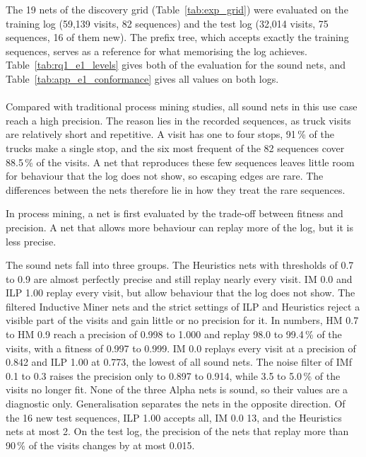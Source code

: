 The 19 nets of the discovery grid (Table~\ref{tab:exp_grid}) were evaluated on the
training log (59,139 visits, 82 sequences) and the test log (32,014 visits, 75
sequences, 16 of them new). The prefix tree, which accepts exactly the training
sequences, serves as a reference for what memorising the log achieves.
Table~\ref{tab:rq1_e1_levels} gives both  of the evaluation for the sound
nets, and Table~\ref{tab:app_e1_conformance} gives all values on both logs.



\paragraph{}
\label{sec:res_e1_level1}
Compared with traditional process mining studies, all sound nets in this use case reach a high precision.
The reason lies in the recorded sequences, as truck visits are relatively short and repetitive. A visit has one
to four stops, 91\,\% of the trucks make a single stop, and the six most frequent of
the 82 sequences cover 88.5\,\% of the visits. A net that reproduces these few
sequences leaves little room for behaviour that the log does not show, so escaping
edges are rare. The differences between the nets therefore lie in how they treat the
rare sequences.

In process mining, a net is first evaluated by the trade-off between fitness and
precision. A net that allows more behaviour can replay more of the log, but it is
less precise. 

The sound nets fall into three groups. The Heuristics nets with thresholds of 0.7 to
0.9 are almost perfectly precise and still replay nearly every visit. IM 0.0 and
ILP 1.00 replay every visit, but allow behaviour that the log does not show. The
filtered Inductive Miner nets and the strict settings of ILP and Heuristics reject a
visible part of the visits and gain little or no precision for it. In numbers, HM 0.7
to HM 0.9 reach a precision of 0.998 to 1.000 and replay 98.0 to 99.4\,\% of the
visits, with a fitness of 0.997 to 0.999. IM 0.0 replays every visit at a precision
of 0.842 and ILP 1.00 at 0.773, the lowest of all sound nets. The noise filter of
IMf 0.1 to 0.3 raises the precision only to 0.897 to 0.914, while 3.5 to 5.0\,\% of
the visits no longer fit. None of the three Alpha nets is sound, so their values are
a diagnostic only. Generalisation separates the nets in the opposite direction. Of
the 16 new test sequences, ILP 1.00 accepts all, IM 0.0 13, and the Heuristics nets
at most 2. On the test log, the precision of the nets that replay more than 90\,\% of
the visits changes by at most 0.015.

